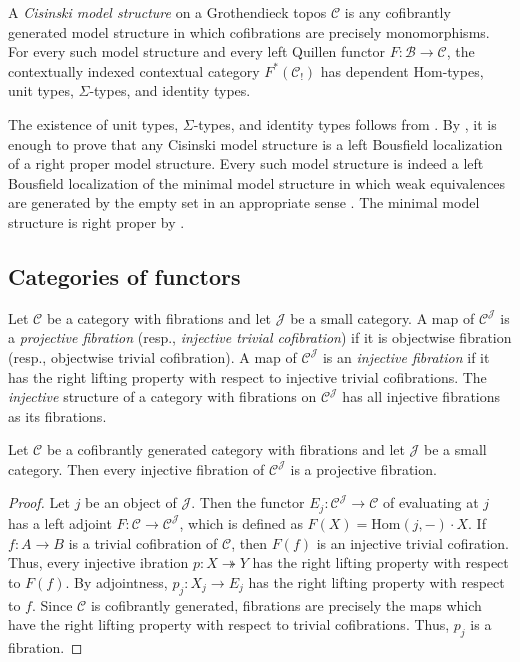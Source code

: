 \documentclass[reqno]{amsart}
\theoremstyle{definition}
\theoremstyle{remark}
\newcommand{\fs}[1]{\mathrm{#1}}
\newcommand{\scat}[1]{\mathcal{#1}}
\newcommand{\Hom}{\fs{Hom}}
\numberwithin{figure}{section}
\begin{document}
\begin{example}[cisinski]
A \emph{Cisinski model structure} on a Grothendieck topos $\scat{C}$ is any cofibrantly generated model structure in which cofibrations are precisely monomorphisms.
For every such model structure and every left Quillen functor $F : \scat{B} \to \scat{C}$,
the contextually indexed contextual category $F^*(\scat{C}_!)$ has dependent $\Hom$-types, unit types, $\Sigma$-types, and identity types.

The existence of unit types, $\Sigma$-types, and identity types follows from .
By , it is enough to prove that any Cisinski model structure is a left Bousfield localization of a right proper model structure.
Every such model structure is indeed a left Bousfield localization of the minimal model structure in which weak equivalences are generated by the empty set in an appropriate sense \cite[Th\'{e}or\`{e}me~3.9]{cisinski}.
The minimal model structure is right proper by \cite[Remarque~4.9]{cisinski}.
\end{example}

\subsection{Categories of functors}

Let $\scat{C}$ be a category with fibrations and let $\scat{J}$ be a small category.
A map of $\scat{C}^\scat{J}$ is a \emph{projective fibration} (resp., \emph{injective trivial cofibration}) if it is objectwise fibration (resp., objectwise trivial cofibration).
A map of $\scat{C}^\scat{J}$ is an \emph{injective fibration} if it has the right lifting property with respect to injective trivial cofibrations.
The \emph{injective} structure of a category with fibrations on $\scat{C}^\scat{J}$ has all injective fibrations as its fibrations.

\begin{lem}
Let $\scat{C}$ be a cofibrantly generated category with fibrations and let $\scat{J}$ be a small category.
Then every injective fibration of $\scat{C}^\scat{J}$ is a projective fibration.
\end{lem}
\begin{proof}
Let $j$ be an object of $\scat{J}$.
Then the functor $E_j : \scat{C}^\scat{J} \to \scat{C}$ of evaluating at $j$ has a left adjoint $F : \scat{C} \to \scat{C}^\scat{J}$, which is defined as $F(X) = \Hom(j,-) \cdot X$.
If $f : A \to B$ is a trivial cofibration of $\scat{C}$, then $F(f)$ is an injective trivial cofiration.
Thus, every injective ibration $p : X \twoheadrightarrow Y$ has the right lifting property with respect to $F(f)$.
By adjointness, $p_j : X_j \to E_j$ has the right lifting property with respect to $f$.
Since $\scat{C}$ is cofibrantly generated, fibrations are precisely the maps which have the right lifting property with respect to trivial cofibrations.
Thus, $p_j$ is a fibration.
\end{proof}
\end{document}
